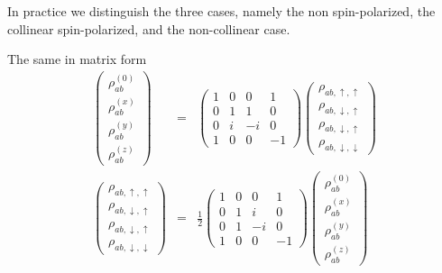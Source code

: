 \documentclass[11pt,a4paper]{report}
\begin{document}
In practice we distinguish the three cases, namely the non spin-polarized,
the collinear spin-polarized, and the non-collinear case.


The same in matrix form 
\begin{eqnarray}
\left(\begin{array}{c}
\rho_{ab}^{(0)}\\\rho_{ab}^{(x)}\\\rho_{ab}^{(y)}\\\rho_{ab}^{(z)}
\end{array}\right)
&=&
\left(\begin{array}{cccc}
1&0&0&1\\0&1&1&0\\0&i&-i&0\\1&0&0&-1
\end{array}\right)
\left(\begin{array}{c}
\rho_{ab,\uparrow,\uparrow}\\\rho_{ab,\downarrow,\uparrow}\\\rho_{ab,\downarrow,\uparrow}\\\rho_{ab,\downarrow,\downarrow}\end{array}\right)
\nonumber\\
\left(\begin{array}{c}
\rho_{ab,\uparrow,\uparrow}\\\rho_{ab,\downarrow,\uparrow}\\\rho_{ab,\downarrow,\uparrow}\\\rho_{ab,\downarrow,\downarrow}\end{array}\right)
&=&
\frac{1}{2}\left(\begin{array}{cccc}
1&0&0&1\\0&1&i&0\\0&1&-i&0\\1&0&0&-1
\end{array}\right)
\left(\begin{array}{c}
\rho_{ab}^{(0)}\\\rho_{ab}^{(x)}\\\rho_{ab}^{(y)}\\\rho_{ab}^{(z)}
\end{array}\right)
\end{eqnarray}



\end{document}
